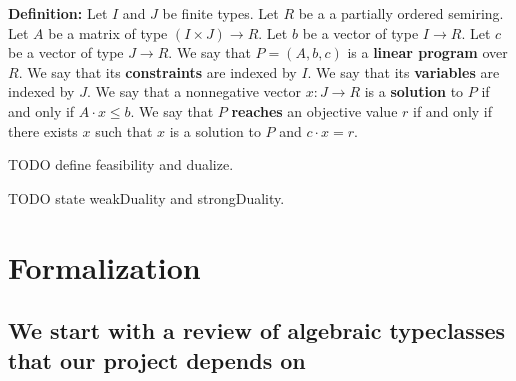 \documentclass[]{article}
\renewcommand{\.}{\hskip .75pt}
\let\r=\rightarrow
\let\*=\cdot
\begin{document}
\medskip \noindent
\textbf{Definition:}
Let $I$ and $J$ be finite types.
Let $R$ be a a partially ordered semiring.
Let $A$ be a matrix of type $(I \times J) \r R$.
Let $b$ be a vector of type $I \r R$.
Let $c$ be a vector of type $J \r R$.
We say that $P = (A, b, c)$ is a \textbf{linear program} over $R$.
We say that its \textbf{constraints} are indexed by $I$.
We say that its \textbf{variables} are indexed by $J$.
We say that a nonnegative vector $x : J \r R$ is
a \textbf{solution} to $P$ if and only if $A \* x \le b$.
We say that $P$ \textbf{reaches} an objective value $r$
if and only if there exists $x$ such that $x$ is a solution to $P$
and $c \* x = r$.

TODO define feasibility and dualize.

TODO state weakDuality and strongDuality.

\section{Formalization}

\subsection{We start with a review of algebraic typeclasses that our project depends on}
\end{document}
